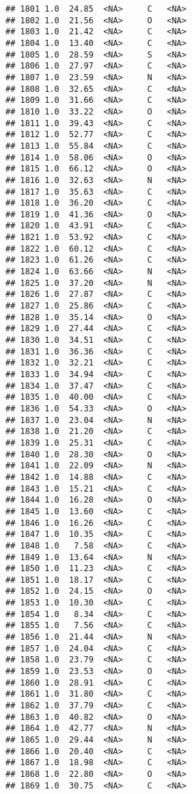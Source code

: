 \documentclass[
]{article}
\begin{document}
\begin{verbatim}
## 1801 1.0  24.85  <NA>     C   <NA>
## 1802 1.0  21.56  <NA>     O   <NA>
## 1803 1.0  21.42  <NA>     C   <NA>
## 1804 1.0  13.40  <NA>     C   <NA>
## 1805 1.0  28.59  <NA>     S   <NA>
## 1806 1.0  27.97  <NA>     C   <NA>
## 1807 1.0  23.59  <NA>     N   <NA>
## 1808 1.0  32.65  <NA>     C   <NA>
## 1809 1.0  31.66  <NA>     C   <NA>
## 1810 1.0  33.22  <NA>     O   <NA>
## 1811 1.0  39.43  <NA>     C   <NA>
## 1812 1.0  52.77  <NA>     C   <NA>
## 1813 1.0  55.84  <NA>     C   <NA>
## 1814 1.0  58.06  <NA>     O   <NA>
## 1815 1.0  66.12  <NA>     O   <NA>
## 1816 1.0  32.63  <NA>     N   <NA>
## 1817 1.0  35.63  <NA>     C   <NA>
## 1818 1.0  36.20  <NA>     C   <NA>
## 1819 1.0  41.36  <NA>     O   <NA>
## 1820 1.0  43.91  <NA>     C   <NA>
## 1821 1.0  53.92  <NA>     C   <NA>
## 1822 1.0  60.12  <NA>     C   <NA>
## 1823 1.0  61.26  <NA>     C   <NA>
## 1824 1.0  63.66  <NA>     N   <NA>
## 1825 1.0  37.20  <NA>     N   <NA>
## 1826 1.0  27.87  <NA>     C   <NA>
## 1827 1.0  25.86  <NA>     C   <NA>
## 1828 1.0  35.14  <NA>     O   <NA>
## 1829 1.0  27.44  <NA>     C   <NA>
## 1830 1.0  34.51  <NA>     C   <NA>
## 1831 1.0  36.36  <NA>     C   <NA>
## 1832 1.0  32.21  <NA>     C   <NA>
## 1833 1.0  34.94  <NA>     C   <NA>
## 1834 1.0  37.47  <NA>     C   <NA>
## 1835 1.0  40.00  <NA>     C   <NA>
## 1836 1.0  54.33  <NA>     O   <NA>
## 1837 1.0  23.04  <NA>     N   <NA>
## 1838 1.0  21.20  <NA>     C   <NA>
## 1839 1.0  25.31  <NA>     C   <NA>
## 1840 1.0  28.30  <NA>     O   <NA>
## 1841 1.0  22.09  <NA>     N   <NA>
## 1842 1.0  14.88  <NA>     C   <NA>
## 1843 1.0  15.21  <NA>     C   <NA>
## 1844 1.0  16.28  <NA>     O   <NA>
## 1845 1.0  13.60  <NA>     C   <NA>
## 1846 1.0  16.26  <NA>     C   <NA>
## 1847 1.0  10.35  <NA>     C   <NA>
## 1848 1.0   7.58  <NA>     C   <NA>
## 1849 1.0  13.64  <NA>     N   <NA>
## 1850 1.0  11.23  <NA>     C   <NA>
## 1851 1.0  18.17  <NA>     C   <NA>
## 1852 1.0  24.15  <NA>     O   <NA>
## 1853 1.0  10.30  <NA>     C   <NA>
## 1854 1.0   8.34  <NA>     C   <NA>
## 1855 1.0   7.56  <NA>     C   <NA>
## 1856 1.0  21.44  <NA>     N   <NA>
## 1857 1.0  24.04  <NA>     C   <NA>
## 1858 1.0  23.79  <NA>     C   <NA>
## 1859 1.0  23.53  <NA>     O   <NA>
## 1860 1.0  28.91  <NA>     C   <NA>
## 1861 1.0  31.80  <NA>     C   <NA>
## 1862 1.0  37.79  <NA>     C   <NA>
## 1863 1.0  40.82  <NA>     O   <NA>
## 1864 1.0  42.77  <NA>     N   <NA>
## 1865 1.0  29.44  <NA>     N   <NA>
## 1866 1.0  20.40  <NA>     C   <NA>
## 1867 1.0  18.98  <NA>     C   <NA>
## 1868 1.0  22.80  <NA>     O   <NA>
## 1869 1.0  30.75  <NA>     C   <NA>

\end{verbatim}
\end{document}
